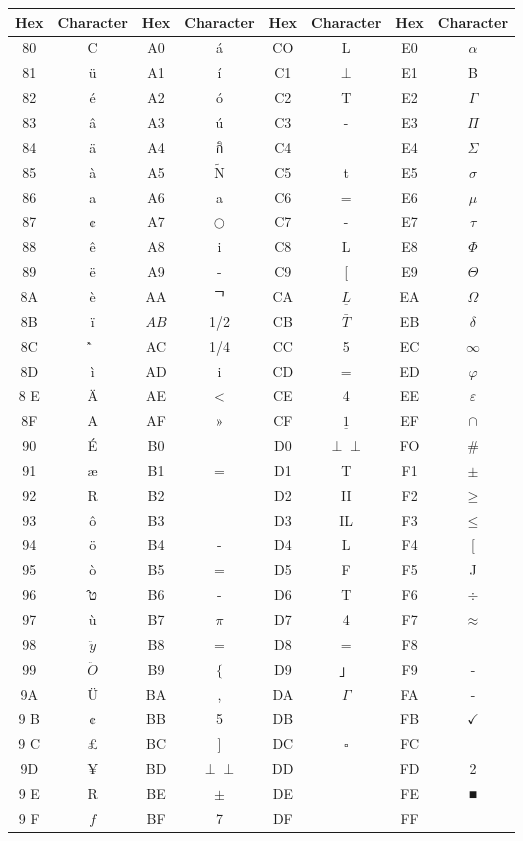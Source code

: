\documentclass[10pt]{article}
\def\Perp{\perp\!\!\!\perp}
\begin{document}
\begin{center}
\begin{tabular}{|c|c|c|c|c|c|c|c|}
\hline
Hex & Character & Hex & Character & Hex & Character & Hex & Character \\
\hline
80 & C & A0 & á & CO & L & E0 & $\alpha$ \\
\hline
81 & ü & A1 & í & C1 & $\perp$ & E1 & B \\
\hline
82 & é & A2 & ó & C2 & T & E2 & $\Gamma$ \\
\hline
83 & â & A3 & ú & C3 & - & E3 & $\Pi$ \\
\hline
84 & ä & A4 & กิ & C4 &  & E4 & $\Sigma$ \\
\hline
85 & à & A5 & $\tilde{\mathrm{N}}$ & C5 & t & E5 & $\sigma$ \\
\hline
86 & a & A6 & a & C6 & $=$ & E6 & $\mu$ \\
\hline
87 & ¢ & A7 & $\bigcirc$ & C7 & - & E7 & $\tau$ \\
\hline
88 & ê & A8 & i & C8 & L & E8 & $\Phi$ \\
\hline
89 & ë & A9 & - & C9 & [ & E9 & $\Theta$ \\
\hline
8A & è & AA & ᄀ & CA & $\underline{L}$ & EA & $\Omega$ \\
\hline
8B & ï & $A B$ & 1/2 & CB & $\bar{T}$ & EB & $\delta$ \\
\hline
8C & ̂̀ & AC & 1/4 & CC & 5 & EC & $\infty$ \\
\hline
8D & ì & AD & i & CD & $=$ & ED & $\varphi$ \\
\hline
8 E & Ä & AE & < & CE & 4 & EE & $\varepsilon$ \\
\hline
8F & A & AF & » & CF & $\underline{1}$ & EF & $\cap$ \\
\hline
90 & É & B0 &  & D0 & $\Perp$ & FO & \# \\
\hline
91 & æ & B1 & = & D1 & T & F1 & $\pm$ \\
\hline
92 & R & B2 &  & D2 & II & F2 & $\geq$ \\
\hline
93 & ô & B3 &  & D3 & IL & F3 & $\leq$ \\
\hline
94 & ö & B4 & - & D4 & L & F4 & [ \\
\hline
95 & ò & B5 & $=$ & D5 & F & F5 & J \\
\hline
96 & ט̂ & B6 & - & D6 & T & F6 & $\div$ \\
\hline
97 & ù & B7 & $\pi$ & D7 & 4 & F7 & $\approx$ \\
\hline
98 & $\ddot{y}$ & B8 & $=$ & D8 & = & F8 &  \\
\hline
99 & $\ddot{O}$ & B9 & $\{$ & D9 & 」 & F9 & - \\
\hline
9A & Ü & BA & , & DA & $\Gamma$ & FA & - \\
\hline
9 B & ¢ & BB & 5 & DB &  & FB & $\checkmark$ \\
\hline
9 C & £ & BC & ] & DC & $\square$ & FC &  \\
\hline
9D & ¥ & BD & $\Perp$ & DD &  & FD & 2 \\
\hline
9 E & R & BE & $\pm$ & DE &  & FE & ■ \\
\hline
9 F & $f$ & BF & 7 & DF &  & FF &  \\
\hline
\end{tabular}
\end{center}
\end{document}
